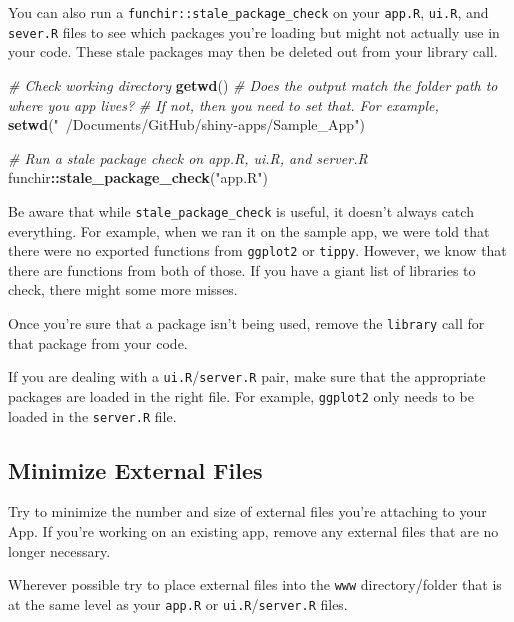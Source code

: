 \documentclass[
]{book}
\newenvironment{Shaded}{\begin{snugshade}}{\end{snugshade}}
\newcommand{\CommentTok}[1]{\textcolor[rgb]{0.56,0.35,0.01}{\textit{#1}}}
\newcommand{\KeywordTok}[1]{\textcolor[rgb]{0.13,0.29,0.53}{\textbf{#1}}}
\newcommand{\NormalTok}[1]{#1}
\newcommand{\OperatorTok}[1]{\textcolor[rgb]{0.81,0.36,0.00}{\textbf{#1}}}
\newcommand{\StringTok}[1]{\textcolor[rgb]{0.31,0.60,0.02}{#1}}
\begin{document}
You can also run a \texttt{funchir::stale\_package\_check} on your \texttt{app.R}, \texttt{ui.R}, and \texttt{sever.R} files to see which packages you're loading but might not actually use in your code. These stale packages may then be deleted out from your library call.

\begin{Shaded}
\begin{Highlighting}[]
\CommentTok{# Check working directory}
\KeywordTok{getwd}\NormalTok{()}
\CommentTok{# Does the output match the folder path to where you app lives?}
\CommentTok{# If not, then you need to set that. For example,}
\KeywordTok{setwd}\NormalTok{(}\StringTok{"~/Documents/GitHub/shiny-apps/Sample_App"}\NormalTok{)}

\CommentTok{# Run a stale package check on app.R, ui.R, and server.R}
\NormalTok{funchir}\OperatorTok{::}\KeywordTok{stale_package_check}\NormalTok{(}\StringTok{"app.R"}\NormalTok{)}
\end{Highlighting}
\end{Shaded}

Be aware that while \texttt{stale\_package\_check} is useful, it doesn't always catch everything. For example, when we ran it on the sample app, we were told that there were no exported functions from \texttt{ggplot2} or \texttt{tippy}. However, we know that there are functions from both of those. If you have a giant list of libraries to check, there might some more misses.

Once you're sure that a package isn't being used, remove the \texttt{library} call for that package from your code.

If you are dealing with a \texttt{ui.R}/\texttt{server.R} pair, make sure that the appropriate packages are loaded in the right file. For example, \texttt{ggplot2} only needs to be loaded in the \texttt{server.R} file.

\hypertarget{exFilesc}{%
\subsection{Minimize External Files}\label{exFilesc}}

Try to minimize the number and size of external files you're attaching to your App. If you're working on an existing app, remove any external files that are no longer necessary.

Wherever possible try to place external files into the \texttt{www} directory/folder that is at the same level as your \texttt{app.R} or \texttt{ui.R}/\texttt{server.R} files.
\end{document}
